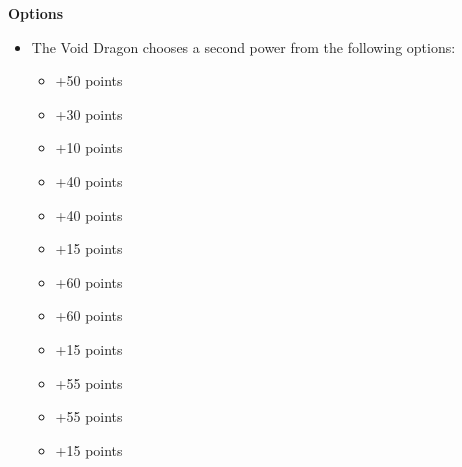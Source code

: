 \begin{minipage}[t]{0.72\textwidth}
	\vspace*{2em}
	\textbf{Options}
	\begin{itemize}
		\item The Void Dragon chooses a second power from the following options:
		\begin{itemize}
			\item {} \dotfill +50 points
			\item {} \dotfill +30 points
			\item {} \dotfill +10 points
			\item {} \dotfill +40 points
			\item {} \dotfill +40 points
			\item {} \dotfill +15 points
			\item {} \dotfill +60 points
			\item {} \dotfill +60 points
			\item {} \dotfill +15 points
			\item {} \dotfill +55 points
			\item {} \dotfill +55 points
			\item {} \dotfill +15 points
		\end{itemize}
	\end{itemize}
\end{minipage}



\newpage
\subsubsection[C'tan Shard of Nyadra'zatha, the Burning One]{}

